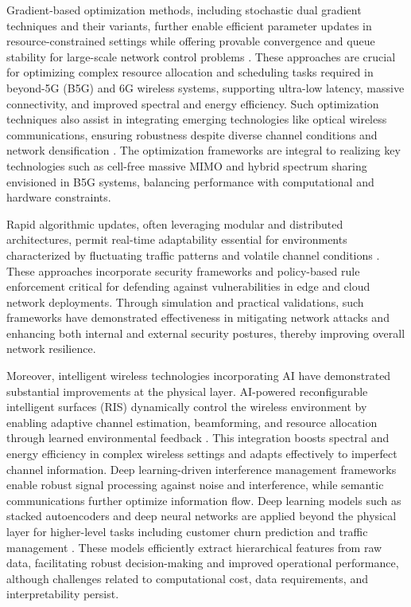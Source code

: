 \documentclass[sigconf]{acmart}
\begin{document}
Gradient-based optimization methods, including stochastic dual gradient techniques and their variants, further enable efficient parameter updates in resource-constrained settings while offering provable convergence and queue stability for large-scale network control problems \cite{ref13,ref14}. These approaches are crucial for optimizing complex resource allocation and scheduling tasks required in beyond-5G (B5G) and 6G wireless systems, supporting ultra-low latency, massive connectivity, and improved spectral and energy efficiency. Such optimization techniques also assist in integrating emerging technologies like optical wireless communications, ensuring robustness despite diverse channel conditions and network densification \cite{ref14}. The optimization frameworks are integral to realizing key technologies such as cell-free massive MIMO and hybrid spectrum sharing envisioned in B5G systems, balancing performance with computational and hardware constraints.

Rapid algorithmic updates, often leveraging modular and distributed architectures, permit real-time adaptability essential for environments characterized by fluctuating traffic patterns and volatile channel conditions \cite{ref15}. These approaches incorporate security frameworks and policy-based rule enforcement critical for defending against vulnerabilities in edge and cloud network deployments. Through simulation and practical validations, such frameworks have demonstrated effectiveness in mitigating network attacks and enhancing both internal and external security postures, thereby improving overall network resilience.

Moreover, intelligent wireless technologies incorporating AI have demonstrated substantial improvements at the physical layer. AI-powered reconfigurable intelligent surfaces (RIS) dynamically control the wireless environment by enabling adaptive channel estimation, beamforming, and resource allocation through learned environmental feedback \cite{ref16,ref49}. This integration boosts spectral and energy efficiency in complex wireless settings and adapts effectively to imperfect channel information. Deep learning-driven interference management frameworks enable robust signal processing against noise and interference, while semantic communications further optimize information flow. Deep learning models such as stacked autoencoders and deep neural networks are applied beyond the physical layer for higher-level tasks including customer churn prediction and traffic management \cite{ref16}. These models efficiently extract hierarchical features from raw data, facilitating robust decision-making and improved operational performance, although challenges related to computational cost, data requirements, and interpretability persist.
\end{document}
